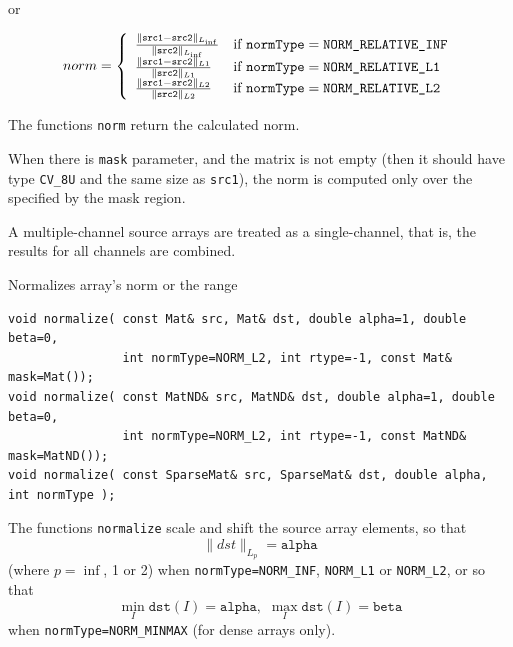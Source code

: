 or

\[
norm = \left\{ \begin{array}{l l} \frac{\|\texttt{src1}-\texttt{src2}\|_{L_{\inf}}    }{\|\texttt{src2}\|_{L_{\inf}}   } & \mbox{if $\texttt{normType} = \texttt{NORM\_RELATIVE\_INF}$}\\ \frac{\|\texttt{src1}-\texttt{src2}\|_{L1} }{\|\texttt{src2}\|_{L1}} & \mbox{if $\texttt{normType} = \texttt{NORM\_RELATIVE\_L1}$}\\ \frac{\|\texttt{src1}-\texttt{src2}\|_{L2} }{\|\texttt{src2}\|_{L2}} & \mbox{if $\texttt{normType} = \texttt{NORM\_RELATIVE\_L2}$}\\ \end{array} \right.
\]

The functions \texttt{norm} return the calculated norm.

When there is \texttt{mask} parameter, and the matrix is not empty (then it should have type \texttt{CV\_8U} and the same size as \texttt{src1}), the norm is computed only over the specified by the mask region.

A multiple-channel source arrays are treated as a single-channel, that is, the results for all channels are combined.


\label{normalize}
Normalizes array's norm or the range

\begin{lstlisting}
void normalize( const Mat& src, Mat& dst, double alpha=1, double beta=0,
                int normType=NORM_L2, int rtype=-1, const Mat& mask=Mat());
void normalize( const MatND& src, MatND& dst, double alpha=1, double beta=0,
                int normType=NORM_L2, int rtype=-1, const MatND& mask=MatND());
void normalize( const SparseMat& src, SparseMat& dst, double alpha, int normType );
\end{lstlisting}
\begin{description}
\end{description}

The functions \texttt{normalize} scale and shift the source array elements, so that
\[\|dst\|_{L_p}=\texttt{alpha}\]
(where $p=\inf$, 1 or 2) when \texttt{normType=NORM\_INF}, \texttt{NORM\_L1} or \texttt{NORM\_L2},
or so that
\[\min_I \texttt{dst}(I)=\texttt{alpha},\,\,\max_I \texttt{dst}(I)=\texttt{beta}\]
when \texttt{normType=NORM\_MINMAX} (for dense arrays only).

